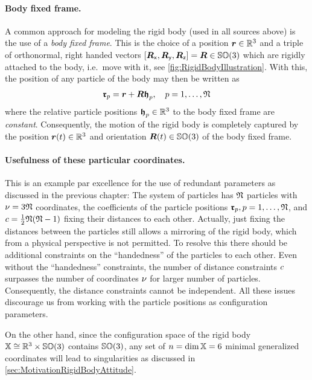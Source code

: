 \paragraph*{Body fixed frame.}
A common approach for modeling the rigid body (used in all sources above) is the use of a \textit{body fixed frame}.
This is the choice of a position $\boldsymbol{r}\in \mathbb{R}^3$ and a triple of orthonormal, right handed vectors $[\boldsymbol{R}_{\mathsf{x}},\boldsymbol{R}_{\mathsf{y}},\boldsymbol{R}_{\mathsf{z}}] = \boldsymbol{R} \in \mathbb{SO}(3)$ which are rigidly attached to the body, i.e.\ move with it, see \autoref{fig:RigidBodyIllustration}.
With this, the position of any particle of the body may then be written as
\begin{align}\label{eq:RBParticlePos}
 \boldsymbol{\mathfrak{r}}_{p} = \boldsymbol{r} + \boldsymbol{R} \boldsymbol{\mathfrak{h}}_{p}, \quad p=1,\ldots,\mathfrak{N}
\end{align}
where the relative particle positions $\boldsymbol{\mathfrak{h}}_{p} \in \mathbb{R}^3$ to the body fixed frame are \textit{constant}.
Consequently, the motion of the rigid body is completely captured by the position $\boldsymbol{r}(t) \in \mathbb{R}^3$ and orientation $\boldsymbol{R}(t) \in \mathbb{SO}(3)$ of the body fixed frame.

\paragraph*{Usefulness of these particular coordinates.}
This is an example par excellence for the use of redundant parameters as discussed in the previous chapter:
The system of particles has $\mathfrak{N}$ particles with $\nu = 3\mathfrak{N}$ coordinates, the coefficients of the particle positions $\boldsymbol{\mathfrak{r}}_{p}, p=1,\ldots,\mathfrak{N}$, and $c = \tfrac{1}{2} \mathfrak{N}(\mathfrak{N}-1)$ fixing their distances to each other.
Actually, just fixing the distances between the particles still allows a mirroring of the rigid body, which from a physical perspective is not permitted. 
To resolve this there should be additional constraints on the ``handedness'' of the particles to each other.
Even without the ``handedness'' constraints, the number of distance constraints $c$ surpasses the number of coordinates $\nu$ for larger number of particles.
Consequently, the distance constraints cannot be independent.
All these issues discourage us from working with the particle positions as configuration parameters.

On the other hand, since the configuration space of the rigid body $\mathbb{X} \cong \mathbb{R}^3 \times \mathbb{SO}(3)$ contains $\mathbb{SO}(3)$, any set of $n=\dim \mathbb{X} = 6$ minimal generalized coordinates will lead to singularities as discussed in \autoref{sec:MotivationRigidBodyAttitude}.

